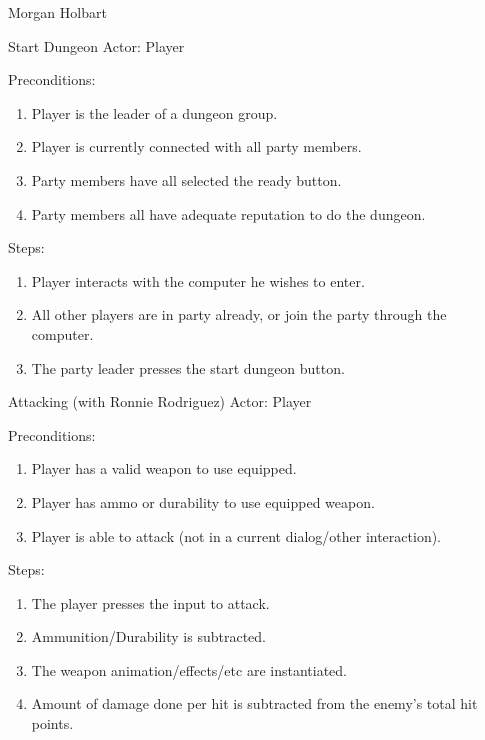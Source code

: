 \documentclass[12pt]{report}
\begin{document}
\begin{section}{Morgan Holbart}
\begin{subsection}{Start Dungeon}
Actor: Player

Preconditions:
\begin{enumerate}
\item Player is the leader of a dungeon group.
\item Player is currently connected with all party members.
\item Party members have all selected the ready button.
\item Party members all have adequate reputation to do the dungeon.
\end{enumerate}

Steps:
\begin{enumerate}
\item Player interacts with the computer he wishes to enter.
\item All other players are in party already, or join the party through the
computer.
\item The party leader presses the start dungeon button.
\end{enumerate}
\end{subsection}

\begin{subsection}{Attacking (with Ronnie Rodriguez)}
Actor: Player

Preconditions:
\begin{enumerate}
\item Player has a valid weapon to use equipped.
\item Player has ammo or durability to use equipped weapon.
\item Player is able to attack (not in a current dialog/other interaction).
\end{enumerate}

Steps:
\begin{enumerate}
\item The player presses the input to attack.
\item Ammunition/Durability is subtracted.
\item The weapon animation/effects/etc are instantiated.
\item Amount of damage done per hit is subtracted from the enemy's total hit
points.
\end{enumerate}
\end{subsection}
\end{section}
\end{document}
